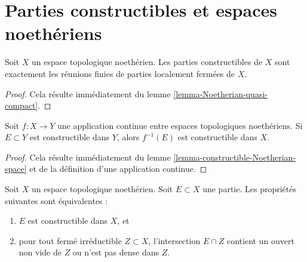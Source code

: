  

\section{Parties constructibles et espaces noethériens}
\label{section-constructible-Noetherian}

\begin{lemma}
\label{lemma-constructible-Noetherian-space}
Soit $X$ un espace topologique noethérien.
Les parties constructibles de $X$ sont exactement les réunions finies de
parties localement fermées de $X$.
\end{lemma}

\begin{proof}
Cela résulte immédiatement du lemme \ref{lemma-Noetherian-quasi-compact}.
\end{proof}

\begin{lemma}
\label{lemma-constructible-map-Noetherian}
Soit $f : X \to Y$ une application continue entre espaces topologiques
noethériens. Si $E \subset Y$ est constructible dans $Y$, alors $f^{-1}(E)$
est constructible dans $X$.
\end{lemma}

\begin{proof}
Cela résulte immédiatement du
lemme \ref{lemma-constructible-Noetherian-space} et de la définition d'une
application continue.
\end{proof}

\begin{lemma}
\label{lemma-characterize-constructible-Noetherian}
Soit $X$ un espace topologique noethérien.
Soit $E \subset X$ une partie.
Les propriétés suivantes sont équivalentes :
\begin{enumerate}
\item $E$ est constructible dans $X$, et
\item pour tout fermé irréductible $Z \subset X$, l'intersection $E \cap Z$
contient un ouvert non vide de $Z$ ou n'est pas dense dans $Z$.
\end{enumerate}
\end{lemma}

